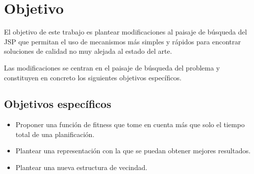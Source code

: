 \section{Objetivo}

El objetivo de este trabajo es plantear modificaciones al paisaje de búsqueda del JSP que permitan el uso de mecanismos más simples y rápidos para encontrar soluciones de calidad no muy alejada al estado del arte. 

Las modificaciones se centran en el paisaje de búsqueda del problema y constituyen en concreto los siguientes objetivos específicos.


\subsection*{Objetivos específicos}
\begin{itemize}
\item Proponer una función de fitness que tome en cuenta más que solo el tiempo total de una planificación.
\item Plantear una representación con la que se puedan obtener mejores resultados.
\item Plantear una nueva estructura de vecindad.
\end{itemize}

